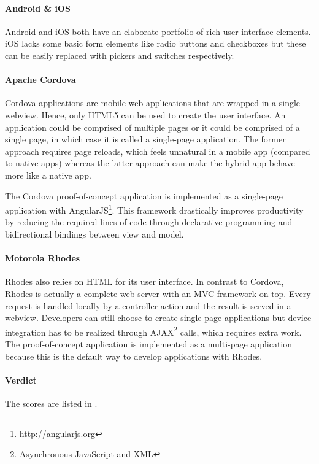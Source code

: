 \paragraph{Android \& iOS} Android and iOS both have an elaborate portfolio of rich user interface elements. iOS lacks some basic form elements like radio buttons and checkboxes but these can be easily replaced with pickers and switches respectively.

\paragraph{Apache Cordova} Cordova applications are mobile web applications that are wrapped in a single webview. Hence, only HTML5 can be used to create the user interface. An application could be comprised of multiple pages or it could be comprised of a single page, in which case it is called  a single-page application. The former approach requires page reloads, which feels unnatural in a mobile app (compared to native apps) whereas the latter approach can make the hybrid app behave more like a native app. 

The Cordova proof-of-concept application is implemented as a single-page application with AngularJS\footnote{\url{http://angularjs.org}}. This framework drastically improves productivity by reducing the required lines of code through declarative programming and bidirectional bindings between view and model. 

\paragraph{Motorola Rhodes} Rhodes also relies on HTML for its user interface. In contrast to Cordova, Rhodes is actually a complete web server with an MVC framework on top. Every request is handled locally by a controller action and the result is served in a webview. Developers can still choose to create single-page applications but device integration has to be realized through AJAX\footnote{Asynchronous JavaScript and XML} calls, which requires extra work. The proof-of-concept application is implemented as a multi-page application because this is the default way to develop applications with Rhodes.

\paragraph{Verdict} The scores are listed in .

